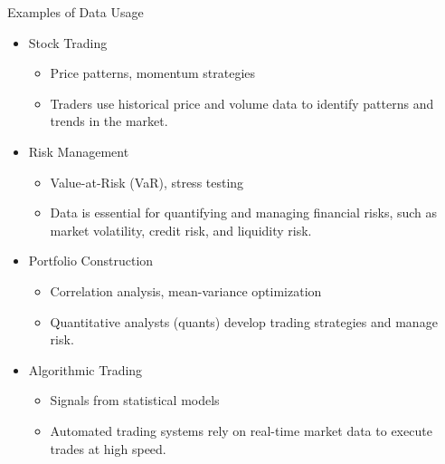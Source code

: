 \documentclass[9pt, aspectratio=169, t]{beamer}
\theoremstyle{definition}
\begin{document}
\begin{frame}{Examples of Data Usage}

\begin{itemize}
    \item Stock Trading
    \begin{itemize}
        \item Price patterns, momentum strategies
        \item Traders use historical price and volume data to identify patterns and trends in the market.
    \end{itemize}
    \item Risk Management
    \begin{itemize}
        \item Value-at-Risk (VaR), stress testing
        \item Data is essential for quantifying and managing financial risks, such as market volatility, credit risk, and liquidity risk.
    \end{itemize}
    \item Portfolio Construction
    \begin{itemize}
        \item Correlation analysis, mean-variance optimization
        \item Quantitative analysts (quants) develop trading strategies and manage risk.
    \end{itemize}
    \item Algorithmic Trading
    \begin{itemize}
        \item Signals from statistical models
        \item Automated trading systems rely on real-time market data to execute trades at high speed.
    \end{itemize}
\end{itemize}

\end{frame}
\end{document}
